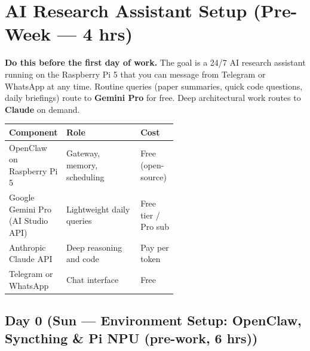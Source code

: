 \documentclass[11pt]{article}
\newcommand{\dayhead}[2]{%
  \subsection*{Day #1 \normalfont\small\color{codegray}(#2)}}
\begin{document}
\newpage

\section*{AI Research Assistant Setup (Pre-Week --- 4 hrs)}

\textbf{Do this before the first day of work.} The goal is a 24/7 AI research
assistant running on the Raspberry Pi 5 that you can message from Telegram or
WhatsApp at any time. Routine queries (paper summaries, quick code questions,
daily briefings) route to \textbf{Gemini Pro} for free. Deep architectural work
routes to \textbf{Claude} on demand.

\begin{center}
\begin{tabularx}{\linewidth}{p{0.34\linewidth}Xp{0.22\linewidth}}
\toprule
\textbf{Component} & \textbf{Role} & \textbf{Cost} \\
\midrule
OpenClaw on Raspberry Pi 5 & Gateway, memory, scheduling & Free (open-source) \\
Google Gemini Pro (AI Studio API) & Lightweight daily queries & Free tier / Pro sub \\
Anthropic Claude API & Deep reasoning and code & Pay per token \\
Telegram or WhatsApp & Chat interface & Free \\
\bottomrule
\end{tabularx}
\end{center}

\dayhead{0}{Sun --- Environment Setup: OpenClaw, Syncthing \& Pi NPU (pre-work, 6 hrs)}
\end{document}
